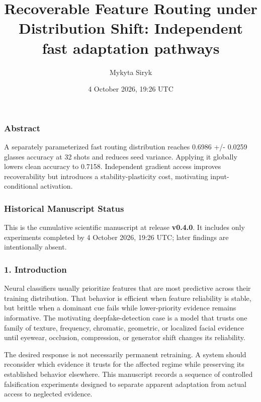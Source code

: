 \documentclass[
  10pt,
]{article}
\title{Recoverable Feature Routing under Distribution Shift: Independent
fast adaptation pathways}
\author{Mykyta Siryk}
\date{4 October 2026, 19:26 UTC}
\begin{document}
\maketitle

\hypertarget{abstract}{%
\subsubsection{Abstract}\label{abstract}}

A separately parameterized fast routing distribution reaches 0.6986 +/-
0.0259 glasses accuracy at 32 shots and reduces seed variance. Applying
it globally lowers clean accuracy to 0.7158. Independent gradient access
improves recoverability but introduces a stability-plasticity cost,
motivating input-conditional activation.

\hypertarget{historical-manuscript-status}{%
\subsubsection{Historical Manuscript
Status}\label{historical-manuscript-status}}

This is the cumulative scientific manuscript at release \textbf{v0.4.0}.
It includes only experiments completed by 4 October 2026, 19:26 UTC;
later findings are intentionally absent.

\hypertarget{introduction}{%
\subsubsection{1. Introduction}\label{introduction}}

Neural classifiers usually prioritize features that are most predictive
across their training distribution. That behavior is efficient when
feature reliability is stable, but brittle when a dominant cue fails
while lower-priority evidence remains informative. The motivating
deepfake-detection case is a model that trusts one family of texture,
frequency, chromatic, geometric, or localized facial evidence until
eyewear, occlusion, compression, or generator shift changes its
reliability.

The desired response is not necessarily permanent retraining. A system
should reconsider which evidence it trusts for the affected regime while
preserving its established behavior elsewhere. This manuscript records a
sequence of controlled falsification experiments designed to separate
apparent adaptation from actual access to neglected evidence.
\end{document}
